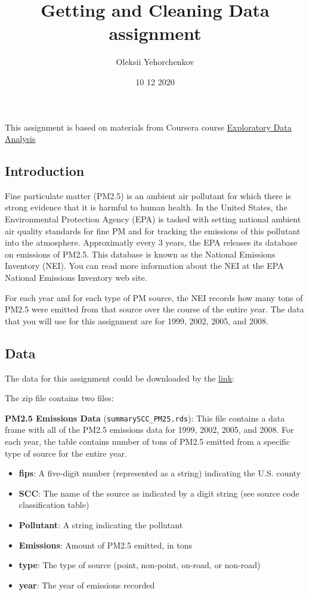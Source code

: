 \documentclass[
]{article}
\title{Getting and Cleaning Data assignment}
\author{Oleksii Yehorchenkov}
\date{10 12 2020}
\providecommand{\tightlist}{%
  \setlength{\itemsep}{0pt}\setlength{\parskip}{0pt}}
\begin{document}
\maketitle

This assignment is based on materials from Coursera course
\href{https://www.coursera.org/learn/exploratory-data-analysis/home/welcome}{Exploratory
Data Analysis}

\hypertarget{introduction}{%
\subsection{Introduction}\label{introduction}}

Fine particulate matter (PM2.5) is an ambient air pollutant for which
there is strong evidence that it is harmful to human health. In the
United States, the Environmental Protection Agency (EPA) is tasked with
setting national ambient air quality standards for fine PM and for
tracking the emissions of this pollutant into the atmosphere.
Approximatly every 3 years, the EPA releases its database on emissions
of PM2.5. This database is known as the National Emissions Inventory
(NEI). You can read more information about the NEI at the EPA National
Emissions Inventory web site.

For each year and for each type of PM source, the NEI records how many
tons of PM2.5 were emitted from that source over the course of the
entire year. The data that you will use for this assignment are for
1999, 2002, 2005, and 2008.

\hypertarget{data}{%
\subsection{Data}\label{data}}

The data for this assignment could be downloaded by the
\href{https://www.dropbox.com/s/fey54ngk8g4z6rr/exdata_data_NEI_data.zip?dl=0}{link}:

The zip file contains two files:

\textbf{PM2.5 Emissions Data} (\texttt{summarySCC\_PM25.rds}): This file
contains a data frame with all of the PM2.5 emissions data for 1999,
2002, 2005, and 2008. For each year, the table contains number of tons
of PM2.5 emitted from a specific type of source for the entire year.

\begin{itemize}
\tightlist
\item
  \textbf{fips}: A five-digit number (represented as a string)
  indicating the U.S. county
\item
  \textbf{SCC}: The name of the source as indicated by a digit string
  (see source code classification table)
\item
  \textbf{Pollutant}: A string indicating the pollutant
\item
  \textbf{Emissions}: Amount of PM2.5 emitted, in tons
\item
  \textbf{type}: The type of source (point, non-point, on-road, or
  non-road)
\item
  \textbf{year}: The year of emissions recorded
\end{itemize}
\end{document}
